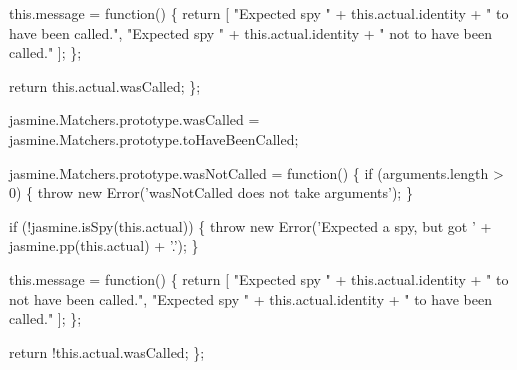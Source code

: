 \begin{DoxyCodeInclude}
  this.message = \textcolor{keyword}{function}() \{
    \textcolor{keywordflow}{return} [
      \textcolor{stringliteral}{"Expected spy "} + this.actual.identity + \textcolor{stringliteral}{" to have been called."},
      \textcolor{stringliteral}{"Expected spy "} + this.actual.identity + \textcolor{stringliteral}{" not to have been called."}
    ];
  \};

  \textcolor{keywordflow}{return} this.actual.wasCalled;
\};

jasmine.Matchers.prototype.wasCalled = jasmine.Matchers.prototype.toHaveBeenCalled;

jasmine.Matchers.prototype.wasNotCalled = \textcolor{keyword}{function}() \{
  \textcolor{keywordflow}{if} (arguments.length > 0) \{
    \textcolor{keywordflow}{throw} \textcolor{keyword}{new} Error(\textcolor{stringliteral}{'wasNotCalled does not take arguments'});
  \}

  \textcolor{keywordflow}{if} (!jasmine.isSpy(\textcolor{keyword}{this}.actual)) \{
    \textcolor{keywordflow}{throw} \textcolor{keyword}{new} Error(\textcolor{stringliteral}{'Expected a spy, but got '} + jasmine.pp(\textcolor{keyword}{this}.actual) + \textcolor{charliteral}{'.'});
  \}

  this.message = \textcolor{keyword}{function}() \{
    \textcolor{keywordflow}{return} [
      \textcolor{stringliteral}{"Expected spy "} + this.actual.identity + \textcolor{stringliteral}{" to not have been called."},
      \textcolor{stringliteral}{"Expected spy "} + this.actual.identity + \textcolor{stringliteral}{" to have been called."}
    ];
  \};

  \textcolor{keywordflow}{return} !this.actual.wasCalled;
\};


\end{DoxyCodeInclude}
